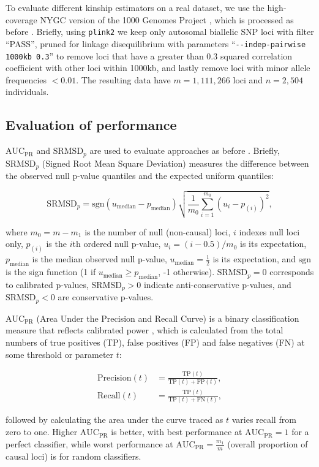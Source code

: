 \documentclass[11pt]{article}
\newcommand{\rmsd}{\text{SRMSD}_p}
\newcommand{\auc}{\text{AUC}_\text{PR}}
\begin{document}
\begin{linenumbers}
To evaluate different kinship estimators on a real dataset, we use the high-coverage NYGC version of the 1000 Genomes Project \citep{fairley_international_2020}, which is processed as before \citep{yao_limitations_2022}.
Briefly, using \texttt{plink2} \citep{chang_second-generation_2015} we keep only autosomal biallelic SNP loci with filter ``PASS'', pruned for linkage disequilibrium with parameters ``\texttt{-{}-indep-pairwise 1000kb 0.3}'' to remove loci that have a greater than 0.3 squared correlation coefficient with other loci within 1000kb, and lastly remove loci with minor allele frequencies $< 0.01$.
The resulting data have $m=1,111,266$ loci and $n=2,504$ individuals.

\subsection{Evaluation of performance}

$\auc$ and $\rmsd$ are used to evaluate approaches as before \citep{yao_limitations_2022}.
Briefly, $\rmsd$ (Signed Root Mean Square Deviation) measures the difference between the observed null p-value quantiles and the expected uniform quantiles:
\begin{linenomath*}
$$
\rmsd
=
\text{sgn}(u_\text{median} - p_\text{median} ) \sqrt{ \frac{1}{m_0} \sum_{i = 1}^{m_0} \left( u_i - p_{(i)} \right)^2 },
$$
\end{linenomath*}
where
$m_0 = m - m_1$ is the number of null (non-causal) loci,
$i$ indexes null loci only,
$p_{(i)}$ is the $i$th ordered null p-value,
$u_i = ( i - 0.5 ) / m_0$ is its expectation,
$p_\text{median}$ is the median observed null p-value,
$u_\text{median} = \frac{1}{2}$ is its expectation,
and $\text{sgn}$ is the sign function (1 if $u_\text{median} \ge p_\text{median}$, -1 otherwise).
$\rmsd = 0$ corresponds to calibrated p-values, $\rmsd > 0$ indicate anti-conservative p-values, and $\rmsd < 0$ are conservative p-values.

$\auc$ (Area Under the Precision and Recall Curve) is a binary classification measure that reflects calibrated power \citep{yao_limitations_2022}, which is calculated from the total numbers of true positives (TP), false positives (FP) and false negatives (FN) at some threshold or parameter $t$:
\begin{linenomath*}
\begin{align*}
  \text{Precision}(t)
  &=
    \frac{ \text{TP}(t) }{ \text{TP}(t) + \text{FP}(t) }
    , \\
  \text{Recall}(t)
  &=
    \frac{ \text{TP}(t) }{ \text{TP}(t) + \text{FN}(t) }
    ,
\end{align*}
\end{linenomath*}
followed by calculating the area under the curve traced as $t$ varies recall from zero to one.
Higher $\auc$ is better, with best performance at $\auc = 1$ for a perfect classifier, while worst performance at $\auc = \frac{m_1}{m}$ (overall proportion of causal loci) is for random classifiers.




\end{linenumbers}
\end{document}

